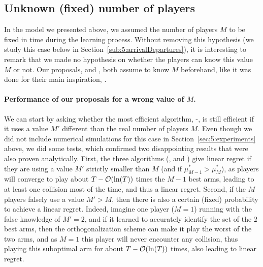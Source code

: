 




\subsection{Unknown (fixed) number of players}
\label{sub:5:unknownNumberOfPlayers}

In the model we presented above, we assumed the number of players $M$ to be fixed in time during the learning process.
Without removing this hypothesis (we study this case below in Section~\ref{sub:5:arrivalDepartures}), it is interesting to remark that we made no hypothesis on whether the players can know this value $M$ or not.
Our proposals, \RandTopM{} and \MCTopM, both assume to know $M$ beforehand, like it was done for their main inspiration, \RhoRand.


\paragraph{Performance of our proposals for a wrong value of $M$.}
\label{par:5:usingWrongValueofM}
%
We can start by asking whether the most efficient algorithm, \MCTopM-\klUCB, is still efficient if it uses a value $M'$ different than the real number of players $M$.
Even though we did not include numerical simulations for this case in Section~\ref{sec:5:experiments} above, we did some tests, which confirmed two disappointing results that were also proven analytically.
First, the three algorithms (\RhoRand, \RandTopM{} and \MCTopM) give linear regret if they are using a value $M'$ strictly smaller than $M$ (and if $\mu^*_{M-1} > \mu^*_M$), as players will converge to play about $T-\mathop{}\mathopen{}\mathcal{O}\mathopen{}\left(\ln(T)\right)$ times the $M-1$ best arms, leading to at least one collision most of the time, and thus a linear regret.
Second, if the $M$ players falsely use a value $M' > M$, then there is also a certain (fixed) probability to achieve a linear regret. Indeed, imagine one player ($M=1$) running \MCTopM{} with the false knowledge of $M'=2$, and if it learned to accurately identify the set of the $2$ best arms, then the \MCTopM{} orthogonalization scheme can make it play the worst of the two arms, and as $M=1$ this player will never encounter any collision, thus playing this suboptimal arm for about $T-\mathop{}\mathopen{}\mathcal{O}\mathopen{}\left(\ln(T)\right)$ times, also leading to linear regret.


